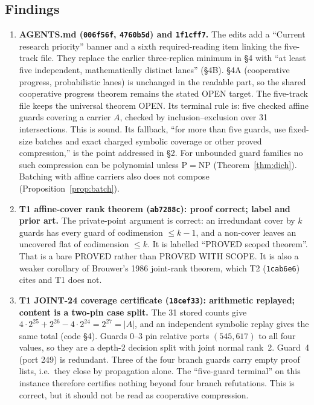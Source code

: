 \documentclass[11pt]{article}
\theoremstyle{definition}
\begin{document}
\subsection*{Findings}
\begin{enumerate}
\item \textbf{AGENTS.md (\texttt{006f56f}, \texttt{4760b5d}) and \texttt{1f1cff7}.} The edits add a ``Current research priority'' banner and a sixth required-reading item linking the five-track file. They replace the earlier three-replica minimum in \S4 with ``at least five independent, mathematically distinct lanes'' (\S4B). \S4A (cooperative progress, probabilistic lanes) is unchanged in the readable part, so the shared cooperative progress theorem remains the stated OPEN target. The five-track file keeps the universal theorem OPEN. Its terminal rule is: five checked affine guards covering a carrier $A$, checked by inclusion--exclusion over 31 intersections. This is sound. Its fallback, ``for more than five guards, use fixed-size batches and exact charged symbolic coverage or other proved compression,'' is the point addressed in \S2. For unbounded guard families no such compression can be polynomial unless P$=$NP (Theorem~\ref{thm:dich}). Batching with affine carriers also does not compose (Proposition~\ref{prop:batch}).
\item \textbf{T1 affine-cover rank theorem (\texttt{ab7288c}): proof correct; label and prior art.} The private-point argument is correct: an irredundant cover by $k$ guards has every guard of codimension $\le k-1$, and a non-cover leaves an uncovered flat of codimension $\le k$. It is labelled ``PROVED scoped theorem''. That is a bare PROVED rather than PROVED WITH SCOPE. It is also a weaker corollary of Brouwer's 1986 joint-rank theorem, which T2 (\texttt{1cab6e6}) cites and T1 does not.
\item \textbf{T1 JOINT-24 coverage certificate (\texttt{18cef33}): arithmetic replayed; content is a two-pin case split.} The 31 stored counts give $4\cdot 2^{25}+2^{26}-4\cdot 2^{24}=2^{27}=|A|$, and an independent symbolic replay gives the same total (code \S4). Guards 0--3 pin relative ports $(545,617)$ to all four values, so they are a depth-2 decision split with joint normal rank~2. Guard~4 (port 249) is redundant. Three of the four branch guards carry empty proof lists, i.e.\ they close by propagation alone. The ``five-guard terminal'' on this instance therefore certifies nothing beyond four branch refutations. This is correct, but it should not be read as cooperative compression.

\end{enumerate}
\end{document}
